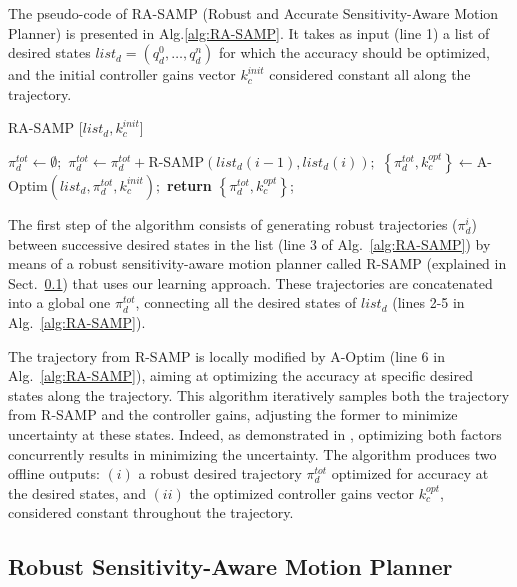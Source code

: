 The pseudo-code of RA-SAMP (Robust and Accurate Sensitivity-Aware Motion Planner) is presented in Alg.\ref{alg:RA-SAMP}. 
It takes as input (line 1) a list of desired states $list_{d} = (q_{d}^0, \dots, q_{d}^n)$ for which the accuracy should be optimized, and the initial controller gains vector $k_{c}^{init}$ considered constant all along the trajectory.

\begin{algorithm}[h]
\caption{RA-SAMP [$list_{d}, k_{c}^{init}$]}\label{alg:RA-SAMP}
\begin{algorithmic}[1]
\State $\pi_d^{tot} \gets \emptyset;$
    \State $\pi_d^{tot} \gets \pi_d^{tot} + $R-SAMP$(list_{d}(i-1),list_{d}(i));$
\EndFor
\State $\left \{ \pi_d^{tot}, k_{c}^{opt} \right \} \gets $A-Optim$(list_{d},\pi_d^{tot}, k_{c}^{init});$
\State \textbf{return} $\left \{ \pi_d^{tot}, k_{c}^{opt}  \right \}$;
\end{algorithmic}
\end{algorithm}

The first step of the algorithm consists of generating robust trajectories ($\pi_d^i$) between successive desired states in the list (line 3 of Alg.~\ref{alg:RA-SAMP}) by means of a robust sensitivity-aware motion planner called R-SAMP (explained in Sect.~\ref{sec:RSAMP}) that uses our learning approach.
These trajectories are concatenated into a global one $\pi_d^{tot}$, connecting all the desired states of $list_{d}$ (lines 2-5 in Alg.~\ref{alg:RA-SAMP}). 

The trajectory from R-SAMP is locally modified by A-Optim (line 6 in Alg.~\ref{alg:RA-SAMP}), aiming at optimizing the accuracy at specific desired states along the trajectory. 
This algorithm iteratively samples both the trajectory from R-SAMP and the controller gains, adjusting the former to minimize uncertainty at these states. 
Indeed, as demonstrated in \cite{AliIROS}, optimizing both factors concurrently results in minimizing the uncertainty.
The algorithm produces two offline outputs: $(i)$ a robust desired trajectory $\pi_d^{tot}$ optimized for accuracy at the desired states, and $(ii)$ the optimized controller gains vector $k_{c}^{opt}$, considered constant throughout the trajectory.

\subsection{Robust Sensitivity-Aware Motion Planner}\label{sec:RSAMP}

